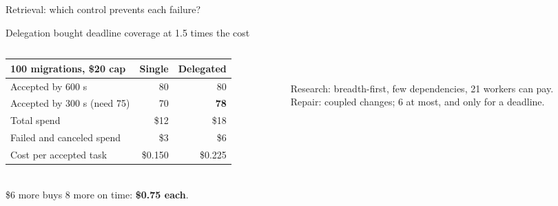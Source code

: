 \documentclass[aspectratio=169, 12pt]{beamer}
\begin{document}
\begin{frame}{Retrieval: which control prevents each failure?}
{    


  }
\end{frame}

\begin{frame}{Delegation bought deadline coverage at 1.5 times the cost}
  \begin{columns}[c]
    \begin{column}{0.56\textwidth}
      \footnotesize
      \begin{tabular}{@{}lrr@{}}\toprule
        \textbf{100 migrations, \$20 cap} & \textbf{Single} & \textbf{Delegated}\\\midrule
        Accepted by 600 s & 80 & 80\\
        Accepted by 300 s (need 75) & 70 & \textbf{78}\\
        Total spend & \$12 & \$18\\
        Failed and canceled spend & \$3 & \$6\\
        Cost per accepted task & \$0.150 & \$0.225\\\bottomrule
      \end{tabular}\\[0.2cm]
      \small \$6 more buys 8 more on time: \textbf{\$0.75 each}.
    \end{column}
    \begin{column}{0.41\textwidth}
      \centering{}\\[0.1cm]
      \small\raggedright Research: breadth-first, few dependencies, 21 workers can pay.\\[0.05cm]
      Repair: coupled changes; 6 at most, and only for a deadline.
    \end{column}
  \end{columns}
\end{frame}
\end{document}
